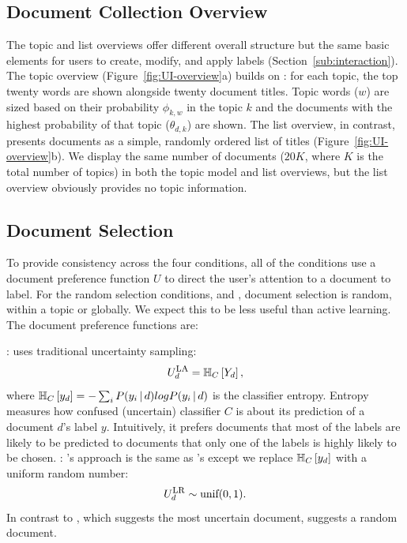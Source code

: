 \subsection{Document Collection Overview}\label{sub:UI}



The topic and list overviews offer different overall structure but the
same basic elements for users to create, modify, and apply labels
(Section~\ref{sub:interaction}). The topic overview
(Figure~\ref{fig:UI-overview}a) builds on : for each
topic, the top twenty words are shown alongside twenty document
titles. Topic words ($w$) are sized based on their probability
$\phi_{k,w}$ in the topic $k$ and the documents with the highest
probability of that topic ($\theta_{d,k}$) are shown.  The list
overview, in contrast, presents documents as a simple, randomly
ordered list of titles (Figure~\ref{fig:UI-overview}b). We
display the same number of documents ($20K$, where $K$ is the total
number of topics) in both the topic model and list overviews, but the
list overview obviously provides no topic information.

\subsection{Document Selection}\label{sub:AL}










To provide consistency across the four conditions,  all of the conditions use a
document preference function $U$ to direct the user's attention to a document to label.  For the random selection
conditions,  and , document selection is random, within a topic or globally.
We expect this to be less useful than active
learning. The document preference functions are:

\noindent
\textbf{}:  uses traditional uncertainty sampling:
\begin{equation}\label{eq:AL_UA}
	U_{d}^{\mbox{\textsc{la}}} = \mathbb{H}_{C}\left[ Y_d \right],
\end{equation}
 where
$\mathbb{H}_{C}\left[ y_d \right] = -\sum_{i} P(y_i \, | \, d)log P(y_i \, | \, d)$ is the classifier entropy. Entropy measures how confused (uncertain) classifier $C$ is about its prediction of a document $d$'s label $y$. Intuitively, it prefers documents that most of the labels are likely to be predicted to documents that only one of the labels is highly likely to be chosen.
\noindent
\textbf{}: 's approach is the same as 's
except we replace $\mathbb{H}_{C}\left[ y_d \right]$ with a uniform random number:
\begin{equation}\label{eq:AL_UR}
	U_{d}^{\mbox{\textsc{lr}}} \sim \mbox{unif}(0,1).
\end{equation}
 In contrast to , which suggests the most uncertain document,  suggests a random document.

